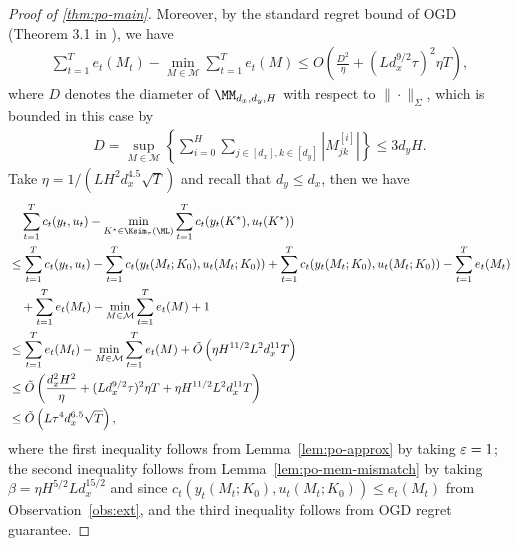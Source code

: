 \begin{proof} [Proof of \cref{thm:po-main}]
Moreover, by the standard regret bound of OGD (Theorem 3.1 in \cite{hazan2016introduction}), we have
\begin{align*}
\sum_{t=1}^T e_t(M_t)-\min_{M\in\mathcal{M}}\sum_{t=1}^T e_t(M)\le O\left(\frac{D^2}{\eta}+(Ld_x^{9/2}\tau)^2\eta T\right), 
\end{align*}
where $D$ denotes the diameter of $\MM_{d_x,d_y,H}$ with respect to $\|\cdot\|_{\Sigma}$, which is bounded in this case by 
\begin{align*}
D=\sup_{M\in\mathcal{M}}\left\{ \sum_{i=0}^H\sum_{j\in[d_x],k\in[d_y]}|M^{[i]}_{jk}|\right\}\le 3d_yH.
\end{align*}
Take $\eta=1/(LH^{2}d_x^{4.5}\sqrt{T})$ and recall that $d_y\le d_x$, then we have
\begin{align*}
& \quad \sum_{t=1}^T c_t(y_t,u_t)-\min_{K^{\star}\in \Ksim_\tau(\ML)}\sum_{t=1}^T c_t(y_t(K^{\star}),u_t(K^{\star}))\\
&\le \sum_{t=1}^T c_t(y_t,u_t)-\sum_{t=1}^T c_t(y_t(M_t;K_0),u_t(M_t;K_0))+\sum_{t=1}^T c_t(y_t(M_t;K_0),u_t(M_t;K_0))- \sum_{t=1}^Te_t(M_t)\\
& \quad + \sum_{t=1}^Te_t(M_t)-\min_{M\in\mathcal{M}}\sum_{t=1}^T e_t(M)+1\\
&\le \sum_{t=1}^T e_t(M_t)-\min_{M\in\mathcal{M}}\sum_{t=1}^T e_t(M)+\tilde{O}\left(\eta H^{11/2}L^2d_x^{11} T\right)\\
&\le \tilde{O}\left(\frac{d_x^2H^2}{\eta}+(Ld_x^{9/2}\tau)^2\eta T+\eta H^{11/2}L^2d_x^{11} T\right)\\
&\le \tilde{O}\left(L\tau^{4}d_x^{6.5}\sqrt{T}\right),
\end{align*}
where the first inequality follows from Lemma~\ref{lem:po-approx} by taking $\varepsilon=1$; the second inequality follows from Lemma~\ref{lem:po-mem-mismatch} by taking $\beta=\eta H^{5/2}Ld_x^{15/2}$ and since $c_t(y_t(M_t;K_0),u_t(M_t;K_0))\le e_t(M_t)$ from Observation~\ref{obs:ext}, and the third inequality follows from OGD regret guarantee. 
\end{proof}


